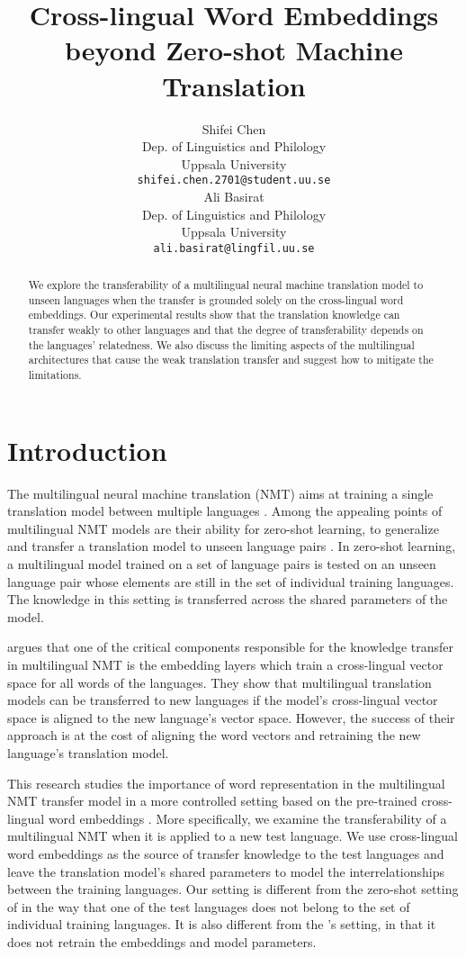 \documentclass[11pt,a4paper]{article}
\title{Cross-lingual Word Embeddings beyond Zero-shot Machine Translation}
\author{Shifei Chen\\
 Dep. of Linguistics and Philology \\
 Uppsala University \\
 \texttt{\small{shifei.chen.2701@student.uu.se}} \\\And
 Ali Basirat \\
 Dep. of Linguistics and Philology \\
 Uppsala University \\
 \texttt{\small{ali.basirat@lingfil.uu.se}} \\}
\date{}
\begin{document}
\maketitle

\begin{abstract}
We explore the transferability of a multilingual neural machine translation model to unseen languages when the transfer is grounded solely on the cross-lingual word embeddings. Our experimental results show that the translation knowledge can transfer weakly to other languages and that the degree of transferability depends on the languages' relatedness. We also discuss the limiting aspects of the multilingual architectures that cause the weak translation transfer and suggest how to mitigate the limitations. 
\end{abstract}

\section{Introduction}
The multilingual neural machine translation (NMT) aims at training a single translation model between multiple languages \citep{Johnson:2016aa,aharoni-etal-2019-massively}.
Among the appealing points of multilingual NMT models are their ability for zero-shot learning, to generalize and transfer a translation model to unseen language pairs \citep{Johnson:2016aa}.
In zero-shot learning, a multilingual model trained on a set of language pairs is tested on an unseen language pair whose elements are still in the set of individual training languages.
The knowledge in this setting is transferred across the shared parameters of the model. 

\citet{Kim:2019aa} argues that one of the critical components responsible for the knowledge transfer in multilingual NMT is the embedding layers which train a cross-lingual vector space for all words of the languages.
They show that multilingual translation models can be transferred to new languages if the model's cross-lingual vector space is aligned to the new language's vector space.
However, the success of their approach is at the cost of aligning the word vectors and retraining the new language's translation model.

This research studies the importance of word representation in the multilingual NMT transfer model in a more controlled setting based on the pre-trained cross-lingual word embeddings \citep{Bojanowski:2016aa,Ammar:2016aa,Joulin:2018aa,Ruder:2019aa}.
More specifically, we examine the transferability of a multilingual NMT when it is applied to a new test language. 
We use cross-lingual word embeddings as the source of transfer knowledge to the test languages and leave the translation model's shared parameters to model the interrelationships between the training languages.
Our setting is different from the zero-shot setting of \citet{Johnson:2016aa} in the way that one of the test languages does not belong to the set of individual training languages.
It is also different from the \citet{Kim:2019aa}'s setting, in that it does not retrain the embeddings and model parameters. 
\end{document}
